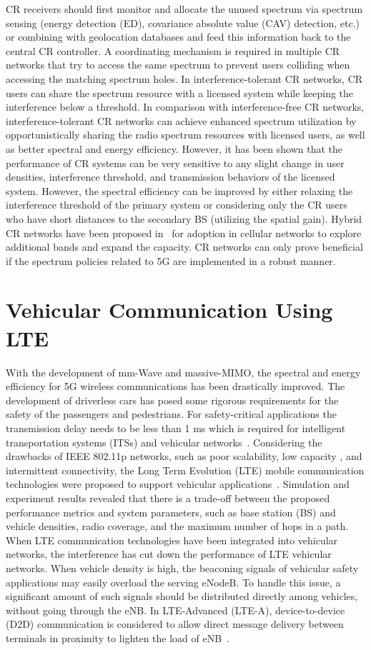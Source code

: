 CR receivers should first monitor and allocate the unused spectrum via spectrum sensing (energy detection (ED), covariance absolute value (CAV) detection, etc.) or combining with geolocation databases and feed this information back to the central CR controller. A coordinating mechanism is required in multiple CR networks that try to access the same spectrum to prevent users colliding when accessing the matching spectrum holes. In interference-tolerant CR networks, CR users can share the spectrum resource with a licensed system while keeping the interference below a threshold. In comparison with interference-free CR networks, interference-tolerant CR networks can achieve enhanced spectrum utilization by opportunistically sharing the radio spectrum resources with licensed users, as well as better spectral and energy efficiency. However, it has been shown that the performance of CR systems can be very sensitive to any slight change in user densities, interference threshold, and transmission behaviors of the licensed system. However, the spectral efficiency can be improved by either relaxing the interference threshold of the primary system or considering only the CR users who have short distances to the secondary BS (utilizing the spatial gain). Hybrid CR networks have been proposed in~\cite{hong2010capacity} for adoption in cellular networks to explore additional bands and expand the capacity. CR networks can only prove beneficial if the spectrum policies related to 5G are implemented in a robust manner. 

\section{Vehicular Communication Using LTE}
With the development of mm-Wave and massive-MIMO, the spectral and energy efficiency for 5G wireless communications has been drastically improved. The development of driverless cars has posed some rigorous requirements for the safety of the passengers and pedestrians. For safety-critical applications the transmission delay needs to be less than 1 ms which is required for intelligent transportation systems (ITSs) and vehicular networks~\cite{ge2016vehicular}. Considering the drawbacks of IEEE 802.11p networks, such as poor scalability, low capacity , and intermittent connectivity, the Long Term Evolution (LTE) mobile communication technologies were proposed to support vehicular applications~\cite{araniti2013lte}. Simulation and experiment results revealed that there is a trade-off between the proposed performance metrics and system parameters, such as base station (BS) and vehicle densities, radio coverage, and  the  maximum  number of hops in a path. When LTE communication technologies have been integrated into vehicular networks, the interference has cut down the performance of LTE vehicular networks. When vehicle density is high, the beaconing signals of vehicular safety applications may easily overload the serving eNodeB. To handle this issue, a significant amount of such signals should be distributed directly among vehicles, without  going  through  the  eNB. In  LTE-Advanced (LTE-A), device-to-device (D2D) communication is considered to allow direct message delivery between terminals in proximity to lighten the load of eNB~\cite{mumtaz2014direct}. 

